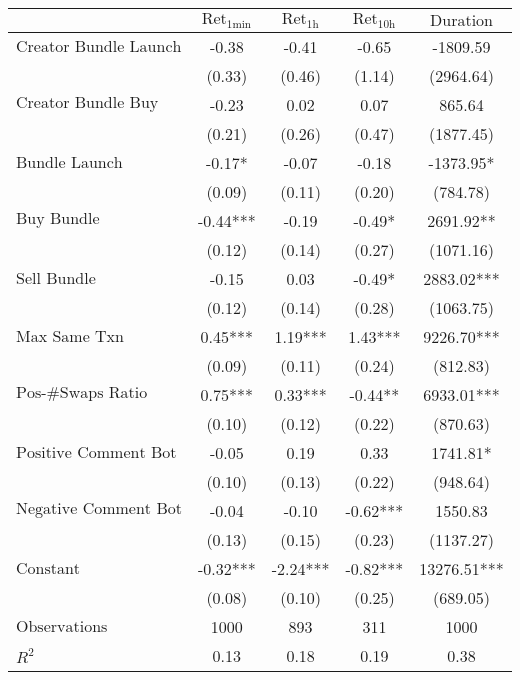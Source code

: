 \begin{tabular}{lcccc}
\hline
 & $\text{Ret}_{\text{1min}}$ & $\text{Ret}_{\text{1h}}$ & $\text{Ret}_{\text{10h}}$ & $\text{Duration}$ \\
\hline
$\text{Creator Bundle Launch}$ & -0.38 & -0.41 & -0.65 & -1809.59 \\
 & (0.33) & (0.46) & (1.14) & (2964.64) \\
$\text{Creator Bundle Buy}$ & -0.23 & 0.02 & 0.07 & 865.64 \\
 & (0.21) & (0.26) & (0.47) & (1877.45) \\
$\text{Bundle Launch}$ & -0.17* & -0.07 & -0.18 & -1373.95* \\
 & (0.09) & (0.11) & (0.20) & (784.78) \\
$\text{Buy Bundle}$ & -0.44*** & -0.19 & -0.49* & 2691.92** \\
 & (0.12) & (0.14) & (0.27) & (1071.16) \\
$\text{Sell Bundle}$ & -0.15 & 0.03 & -0.49* & 2883.02*** \\
 & (0.12) & (0.14) & (0.28) & (1063.75) \\
$\text{Max Same Txn}$ & 0.45*** & 1.19*** & 1.43*** & 9226.70*** \\
 & (0.09) & (0.11) & (0.24) & (812.83) \\
$\text{Pos-\#Swaps Ratio}$ & 0.75*** & 0.33*** & -0.44** & 6933.01*** \\
 & (0.10) & (0.12) & (0.22) & (870.63) \\
$\text{Positive Comment Bot}$ & -0.05 & 0.19 & 0.33 & 1741.81* \\
 & (0.10) & (0.13) & (0.22) & (948.64) \\
$\text{Negative Comment Bot}$ & -0.04 & -0.10 & -0.62*** & 1550.83 \\
 & (0.13) & (0.15) & (0.23) & (1137.27) \\
$\text{Constant}$ & -0.32*** & -2.24*** & -0.82*** & 13276.51*** \\
 & (0.08) & (0.10) & (0.25) & (689.05) \\
$\text{Observations}$ & 1000 & 893 & 311 & 1000 \\
$R^2$ & 0.13 & 0.18 & 0.19 & 0.38 \\
\hline
\end{tabular}